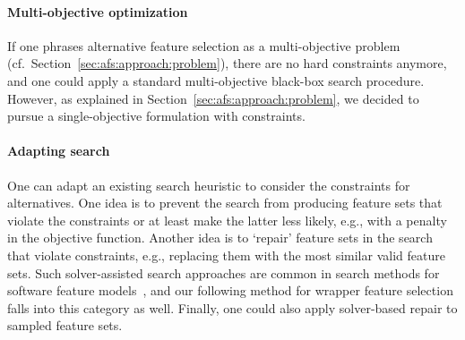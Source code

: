 \documentclass{article}
\theoremstyle{definition}
\begin{document}
\paragraph{Multi-objective optimization}

If one phrases alternative feature selection as a multi-objective problem (cf.~Section~\ref{sec:afs:approach:problem}), there are no hard constraints anymore, and one could apply a standard multi-objective black-box search procedure.
However, as explained in Section~\ref{sec:afs:approach:problem}, we decided to pursue a single-objective formulation with constraints.

\paragraph{Adapting search}

One can adapt an existing search heuristic to consider the constraints for alternatives.
One idea is to prevent the search from producing feature sets that violate the constraints or at least make the latter less likely, e.g., with a penalty in the objective function.
Another idea is to `repair' feature sets in the search that violate constraints, e.g., replacing them with the most similar valid feature sets.
Such solver-assisted search approaches are common in search methods for software feature models~\cite{guo2018preserve, henard2015combining, white2010automated}, and our following method for wrapper feature selection falls into this category as well.
Finally, one could also apply solver-based repair to sampled feature sets.
\end{document}
